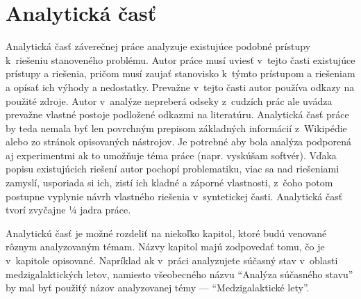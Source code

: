 
\chapter{Analytická časť}

Analytická časť záverečnej práce analyzuje existujúce podobné prístupy k~riešeniu stanoveného problému. Autor práce musí uviesť v~tejto časti existujúce prístupy a riešenia, pričom musí zaujať stanovisko k~týmto prístupom a riešeniam a opísať ich výhody a nedostatky. Prevažne v~tejto časti autor používa odkazy na použité zdroje. Autor v~analýze nepreberá odseky z~cudzích prác ale uvádza prevažne vlastné postoje podložené odkazmi na literatúru. Analytická časť práce by teda nemala byť len povrchným prepisom základných informácií z~Wikipédie alebo zo stránok opisovaných nástrojov. Je potrebné aby bola analýza podporená aj experimentmi ak to umožňuje téma práce (napr. vyskúšam softvér). Vďaka popisu existujúcich riešení autor pochopí problematiku, viac sa nad riešeniami zamyslí, usporiada si ich, zistí ich kladné a záporné vlastnosti, z~čoho potom postupne vyplynie návrh vlastného riešenia v~syntetickej časti. Analytická časť tvorí zvyčajne ¼ jadra práce.

Analytickú časť je možné rozdeliť na niekoľko kapitol, ktoré budú venované rôznym analyzovaným témam. Názvy kapitol majú zodpovedať tomu, čo je v~kapitole opisované. Napríklad ak v~práci analyzujete súčasný stav v~oblasti medzigalaktických letov, namiesto všeobecného názvu "`Analýza súčasného stavu"' by mal byť použiťý názov analyzovanej témy --- "`Medzigalaktické lety"'.


